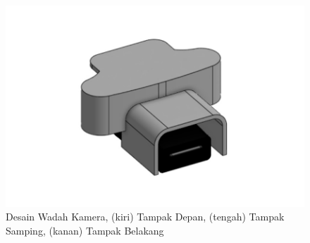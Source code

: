 \begin{figure}
  \includegraphics[scale=0.16]{gambar/bab3-tampak-belakang-case-camera.jpeg}

  \caption{\centering Desain Wadah Kamera, (kiri) Tampak Depan, (tengah) Tampak Samping, (kanan) Tampak Belakang}
  \label{fig:designcontainercamera}
\end{figure}

